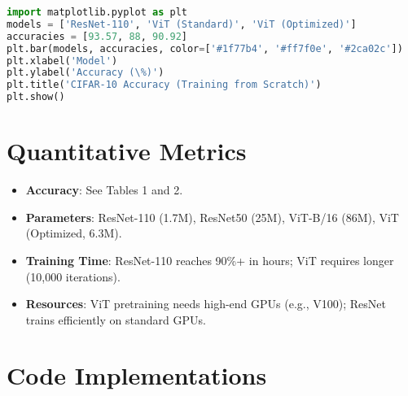 \documentclass[UTF8]{report}
\theoremstyle{MyLineTheoremStyle} %
\theoremstyle{MyBlockTheoremStyle} %
\theoremstyle{MySubsubsectionStyle} %
\begin{document}
\begin{lstlisting}[language=Python]
import matplotlib.pyplot as plt
models = ['ResNet-110', 'ViT (Standard)', 'ViT (Optimized)']
accuracies = [93.57, 88, 90.92]
plt.bar(models, accuracies, color=['#1f77b4', '#ff7f0e', '#2ca02c'])
plt.xlabel('Model')
plt.ylabel('Accuracy (\%)')
plt.title('CIFAR-10 Accuracy (Training from Scratch)')
plt.show()
\end{lstlisting}

\section*{Quantitative Metrics}
\begin{itemize}
    \item \textbf{Accuracy}: See Tables 1 and 2.
    \item \textbf{Parameters}: ResNet-110 (1.7M), ResNet50 (25M), ViT-B/16 (86M), ViT (Optimized, 6.3M).
    \item \textbf{Training Time}: ResNet-110 reaches 90\%+ in hours; ViT requires longer (10,000 iterations).
    \item \textbf{Resources}: ViT pretraining needs high-end GPUs (e.g., V100); ResNet trains efficiently on standard GPUs.
\end{itemize}

\section*{Code Implementations}
\end{document}

